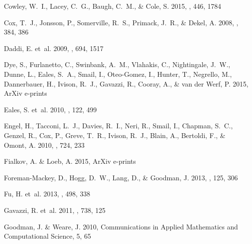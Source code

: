 \documentclass[iop]{emulateapj}
\begin{document}
\begin{thebibliography}{107}
{Cowley}, W.~I., {Lacey}, C.~G., {Baugh}, C.~M., \& {Cole}, S. 2015, \mnras,
  446, 1784

{Cox}, T.~J., {Jonsson}, P., {Somerville}, R.~S., {Primack}, J.~R., \& {Dekel},
  A. 2008, \mnras, 384, 386

{Daddi}, E. {et~al.} 2009, \apj, 694, 1517

{Dye}, S., {Furlanetto}, C., {Swinbank}, A.~M., {Vlahakis}, C., {Nightingale},
  J.~W., {Dunne}, L., {Eales}, S.~A., {Smail}, I., {Oteo-Gomez}, I., {Hunter},
  T., {Negrello}, M., {Dannerbauer}, H., {Ivison}, R.~J., {Gavazzi}, R.,
  {Cooray}, A., \& {van der Werf}, P. 2015, ArXiv e-prints

{Eales}, S. {et~al.} 2010, \pasp, 122, 499

{Engel}, H., {Tacconi}, L.~J., {Davies}, R.~I., {Neri}, R., {Smail}, I.,
  {Chapman}, S.~C., {Genzel}, R., {Cox}, P., {Greve}, T.~R., {Ivison}, R.~J.,
  {Blain}, A., {Bertoldi}, F., \& {Omont}, A. 2010, \apj, 724, 233

{Fialkov}, A. \& {Loeb}, A. 2015, ArXiv e-prints

{Foreman-Mackey}, D., {Hogg}, D.~W., {Lang}, D., \& {Goodman}, J. 2013, \pasp,
  125, 306

{Fu}, H. {et~al.} 2013, \nat, 498, 338

{Gavazzi}, R. {et~al.} 2011, \apj, 738, 125

{Goodman}, J. \& {Weare}, J. 2010, Communications in Applied Mathematics and
  Computational Science, 5, 65


\end{thebibliography}
\end{document}
